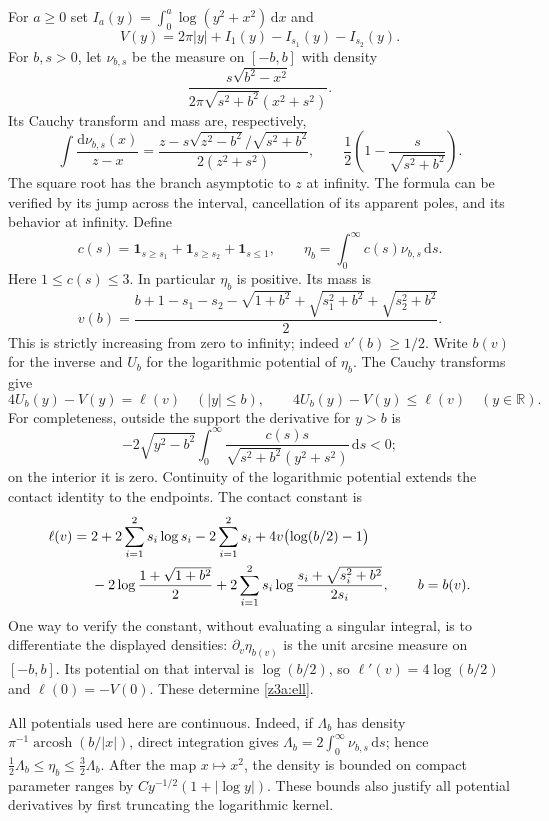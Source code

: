 \documentclass[11pt]{article}
\theoremstyle{definition}\newtheorem{definition}[theorem]{Definition}
\theoremstyle{remark}\newtheorem{remark}[theorem]{Remark}
\begin{document}
For $a\ge0$ set $I_a(y)=\int_0^a\log(y^2+x^2)\,\mathrm dx$ and
\[
 V(y)=2\pi|y|+I_1(y)-I_{s_1}(y)-I_{s_2}(y).
\]
For $b,s>0$, let $\nu_{b,s}$ be the measure on $[-b,b]$ with density
\[
 \frac{s\sqrt{b^2-x^2}}
 {2\pi\sqrt{s^2+b^2}(x^2+s^2)}.
\]
Its Cauchy transform and mass are, respectively,
\[
 \int\frac{\mathrm d\nu_{b,s}(x)}{z-x}
 =\frac{z-s\sqrt{z^2-b^2}/\sqrt{s^2+b^2}}{2(z^2+s^2)},
 \qquad \frac12\left(1-\frac{s}{\sqrt{s^2+b^2}}\right).
\]
The square root has the branch asymptotic to $z$ at infinity.  The formula
can be verified by its jump across the interval, cancellation of its
apparent poles, and its behavior at infinity.  Define
\[
 c(s)=\mathbf1_{s\ge s_1}+\mathbf1_{s\ge s_2}+\mathbf1_{s\le1},
 \qquad \eta_b=\int_0^\infty c(s)\nu_{b,s}\,\mathrm ds.
\]
Here $1\le c(s)\le3$.  In particular $\eta_b$ is positive.  Its mass is
\begin{equation}\label{z3a:mass}
 v(b)=\frac{b+1-s_1-s_2-\sqrt{1+b^2}
             +\sqrt{s_1^2+b^2}+\sqrt{s_2^2+b^2}}2.
\end{equation}
This is strictly increasing from zero to infinity; indeed $v'(b)\ge1/2$.
Write $b(v)$ for the inverse and $U_b$ for the logarithmic potential of
$\eta_b$.  The Cauchy transforms give
\begin{equation}\label{z3a:equilibrium}
 4U_b(y)-V(y)=\ell(v)\quad (|y|\le b),\qquad
 4U_b(y)-V(y)\le\ell(v)\quad (y\in\mathbb R).
\end{equation}
For completeness, outside the support the derivative for $y>b$ is
\[
 -2\sqrt{y^2-b^2}\int_0^\infty
 \frac{c(s)s}{\sqrt{s^2+b^2}(y^2+s^2)}\,\mathrm ds<0;
\]
on the interior it is zero.  Continuity of the logarithmic potential
extends the contact identity to the endpoints.  The contact constant is
\begin{align}
 \ell(v)={}&2+2\sum_{i=1}^2s_i\log s_i-2\sum_{i=1}^2s_i
       +4v\bigl(\log(b/2)-1\bigr)\notag\\
 &-2\log\frac{1+\sqrt{1+b^2}}2
       +2\sum_{i=1}^2s_i
           \log\frac{s_i+\sqrt{s_i^2+b^2}}{2s_i},
 \qquad b=b(v).\label{z3a:ell}
\end{align}
One way to verify the constant, without evaluating a singular integral,
is to differentiate the displayed densities: $\partial_v\eta_{b(v)}$
is the unit arcsine measure on $[-b,b]$.  Its potential on that interval
is $\log(b/2)$, so $\ell'(v)=4\log(b/2)$ and
$\ell(0)=-V(0)$.  These determine \eqref{z3a:ell}.

All potentials used here are continuous.  Indeed, if $\Lambda_b$ has
density $\pi^{-1}\operatorname{arcosh}(b/|x|)$, direct integration gives
$\Lambda_b=2\int_0^\infty\nu_{b,s}\,\mathrm ds$; hence
$\frac12\Lambda_b\le\eta_b\le\frac32\Lambda_b$.
After the map $x\mapsto x^2$, the density is bounded on compact parameter
ranges by $Cy^{-1/2}(1+|\log y|)$.  These bounds also justify all potential
derivatives by first truncating the logarithmic kernel.
\end{document}
